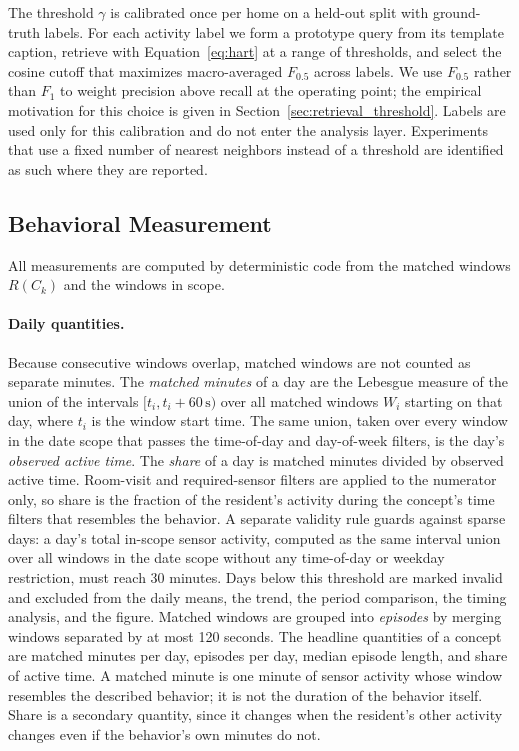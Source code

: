 The threshold $\gamma$ is calibrated once per home on a held-out split with ground-truth labels. For each activity label we form a prototype query from its template caption, retrieve with Equation~\ref{eq:hart} at a range of thresholds, and select the cosine cutoff that maximizes macro-averaged $F_{0.5}$ across labels. We use $F_{0.5}$ rather than $F_1$ to weight precision above recall at the operating point; the empirical motivation for this choice is given in Section~\ref{sec:retrieval_threshold}. Labels are used only for this calibration and do not enter the analysis layer. Experiments that use a fixed number of nearest neighbors instead of a threshold are identified as such where they are reported.


\subsection{Behavioral Measurement}
\label{sec:measurement}

All measurements are computed by deterministic code from the matched windows $R(C_k)$ and the windows in scope.

\paragraph{Daily quantities.}
Because consecutive windows overlap, matched windows are not counted as separate minutes. The \emph{matched minutes} of a day are the Lebesgue measure of the union of the intervals $[t_i, t_i + 60\,\text{s})$ over all matched windows $W_i$ starting on that day, where $t_i$ is the window start time. The same union, taken over every window in the date scope that passes the time-of-day and day-of-week filters, is the day's \emph{observed active time}. The \emph{share} of a day is matched minutes divided by observed active time. Room-visit and required-sensor filters are applied to the numerator only, so share is the fraction of the resident's activity during the concept's time filters that resembles the behavior. A separate validity rule guards against sparse days: a day's total in-scope sensor activity, computed as the same interval union over all windows in the date scope without any time-of-day or weekday restriction, must reach 30 minutes. Days below this threshold are marked invalid and excluded from the daily means, the trend, the period comparison, the timing analysis, and the figure. Matched windows are grouped into \emph{episodes} by merging windows separated by at most 120 seconds. The headline quantities of a concept are matched minutes per day, episodes per day, median episode length, and share of active time. A matched minute is one minute of sensor activity whose window resembles the described behavior; it is not the duration of the behavior itself. Share is a secondary quantity, since it changes when the resident's other activity changes even if the behavior's own minutes do not.

